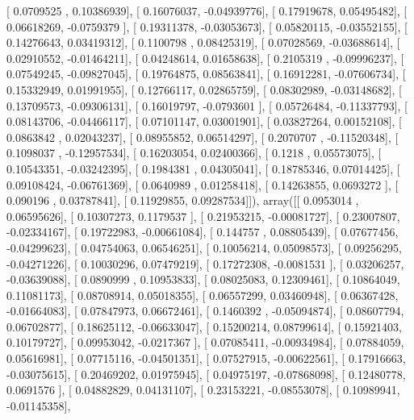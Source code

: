 \documentclass{article}
\begin{document}
       [ 0.0709525 ,  0.10386939],
       [ 0.16076037, -0.04939776],
       [ 0.17919678,  0.05495482],
       [ 0.06618269, -0.0759379 ],
       [ 0.19311378, -0.03053673],
       [ 0.05820115, -0.03552155],
       [ 0.14276643,  0.03419312],
       [ 0.1100798 ,  0.08425319],
       [ 0.07028569, -0.03688614],
       [ 0.02910552, -0.01464211],
       [ 0.04248614,  0.01658638],
       [ 0.2105319 , -0.09996237],
       [ 0.07549245, -0.09827045],
       [ 0.19764875,  0.08563841],
       [ 0.16912281, -0.07606734],
       [ 0.15332949,  0.01991955],
       [ 0.12766117,  0.02865759],
       [ 0.08302989, -0.03148682],
       [ 0.13709573, -0.09306131],
       [ 0.16019797, -0.0793601 ],
       [ 0.05726484, -0.11337793],
       [ 0.08143706, -0.04466117],
       [ 0.07101147,  0.03001901],
       [ 0.03827264,  0.00152108],
       [ 0.0863842 ,  0.02043237],
       [ 0.08955852,  0.06514297],
       [ 0.2070707 , -0.11520348],
       [ 0.1098037 , -0.12957534],
       [ 0.16203054,  0.02400366],
       [ 0.1218    ,  0.05573075],
       [ 0.10543351, -0.03242395],
       [ 0.1984381 ,  0.04305041],
       [ 0.18785346,  0.07014425],
       [ 0.09108424, -0.06761369],
       [ 0.0640989 ,  0.01258418],
       [ 0.14263855,  0.0693272 ],
       [ 0.090196  ,  0.03787841],
       [ 0.11929855,  0.09287534]]), array([[ 0.0953014 ,  0.06595626],
       [ 0.10307273,  0.1179537 ],
       [ 0.21953215, -0.00081727],
       [ 0.23007807, -0.02334167],
       [ 0.19722983, -0.00661084],
       [ 0.144757  ,  0.08805439],
       [ 0.07677456, -0.04299623],
       [ 0.04754063,  0.06546251],
       [ 0.10056214,  0.05098573],
       [ 0.09256295, -0.04271226],
       [ 0.10030296,  0.07479219],
       [ 0.17272308, -0.0081531 ],
       [ 0.03206257, -0.03639088],
       [ 0.0890999 ,  0.10953833],
       [ 0.08025083,  0.12309461],
       [ 0.10864049,  0.11081173],
       [ 0.08708914,  0.05018355],
       [ 0.06557299,  0.03460948],
       [ 0.06367428, -0.01664083],
       [ 0.07847973,  0.06672461],
       [ 0.1460392 , -0.05094874],
       [ 0.08607794,  0.06702877],
       [ 0.18625112, -0.06633047],
       [ 0.15200214,  0.08799614],
       [ 0.15921403,  0.10179727],
       [ 0.09953042, -0.0217367 ],
       [ 0.07085411, -0.00934984],
       [ 0.07884059,  0.05616981],
       [ 0.07715116, -0.04501351],
       [ 0.07527915, -0.00622561],
       [ 0.17916663, -0.03075615],
       [ 0.20469202,  0.01975945],
       [ 0.04975197, -0.07868098],
       [ 0.12480778,  0.0691576 ],
       [ 0.04882829,  0.04131107],
       [ 0.23153221, -0.08553078],
       [ 0.10989941, -0.01145358],
\end{document}

